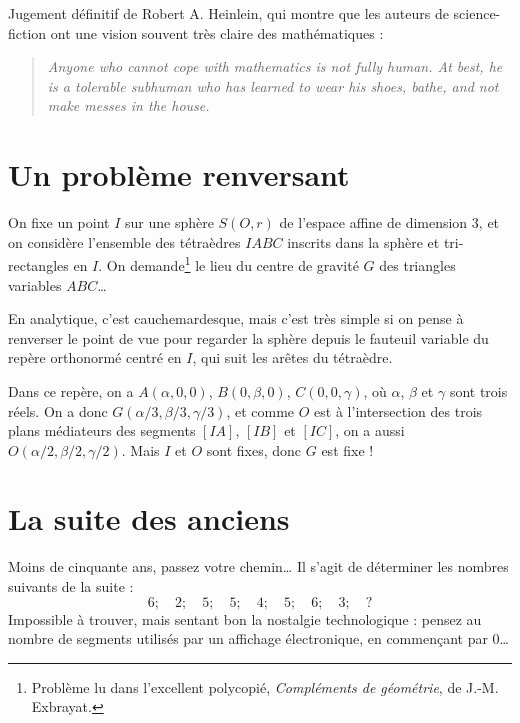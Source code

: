 \documentclass[a4paper,11pt]{article}
\begin{document}
Jugement définitif de Robert A. Heinlein, qui montre que les auteurs de
science-fiction ont une vision souvent très claire des mathématiques :
\begin{quotation}\itshape\noindent
  Anyone who cannot cope with mathematics is not fully human. At best, he
  is a tolerable subhuman who has learned to wear his shoes, bathe, and
  not make messes in the house.
\end{quotation}

\section{Un problème renversant}

On fixe un point $I$ sur une sphère $S(O,r)$ de l'espace affine de dimension
$3$, et on considère l'ensemble des tétraèdres $IABC$ inscrits dans la sphère
et tri-rectangles en $I$. On demande\footnote{
  Problème lu dans l'excellent polycopié,
  {\slshape Compléments de géométrie}, de J.-M. Exbrayat.}
le lieu du centre de gravité $G$ des triangles variables $ABC$\dots

\smallskip
En analytique, c'est cauchemardesque, mais c'est très simple si on pense
à renverser le point de vue pour regarder la sphère depuis le fauteuil
variable du repère orthonormé centré en $I$, qui suit les arêtes du
tétraèdre.

Dans ce repère, on a $A(\alpha,0,0)$, $B(0,\beta,0)$, $C(0,0,\gamma)$,
où $\alpha$, $\beta$ et $\gamma$ sont trois réels.
On a donc $G(\alpha/3, \beta/3, \gamma/3)$, et comme $O$ est à
l'intersection des trois plans médiateurs des segments $[IA]$, $[IB]$ et
$[IC]$, on a aussi $O(\alpha/2, \beta/2, \gamma/2)$.
Mais $I$ et $O$ sont fixes, donc $G$ est fixe !

\section{La suite des anciens}

Moins de cinquante ans, passez votre chemin\dots{}
Il s'agit de déterminer les nombres suivants de la suite :
\[ 6 ;\quad 2;\quad 5;\quad 5; \quad4;\quad 5;\quad 6; \quad 3;\quad ? \]
Impossible à trouver, mais sentant bon la nostalgie technologique :
pensez au nombre de segments utilisés par un affichage électronique,
en commençant par $0$\dots
\end{document}
